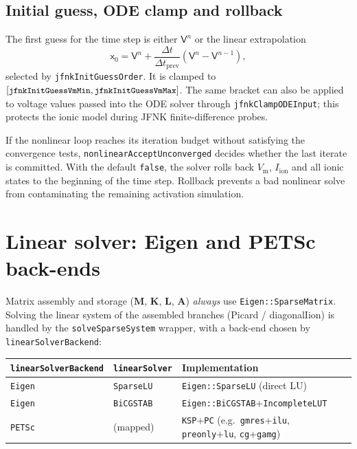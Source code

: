 \documentclass[11pt,a4paper]{article}
\newcommand{\code}[1]{\texttt{\small #1}}
\newcommand{\Vm}{V_{\text{m}}}
\newcommand{\Iion}{I_{\mathrm{ion}}}
\newcommand{\Mmass}{\mathbf{M}}
\newcommand{\Kstif}{\mathbf{K}}
\newcommand{\Lop}{\mathbf{L}}
\newcommand{\Aimp}{\mathbf{A}}
\begin{document}
\subsection{Initial guess, ODE clamp and rollback}

The first guess for the time step is either $\mathsf{V}^{n}$ or the
linear extrapolation
\begin{equation}
  \mathsf{x}_{0}
  =
  \mathsf{V}^{n}
  + \frac{\Delta t}{\Delta t_{\mathrm{prev}}}
    \left(\mathsf{V}^{n}-\mathsf{V}^{n-1}\right),
  \label{eq:extrap}
\end{equation}
selected by \code{jfnkInitGuessOrder}. It is clamped to
$[\code{jfnkInitGuessVmMin},\code{jfnkInitGuessVmMax}]$. The same
bracket can also be applied to voltage values passed into the ODE solver
through \code{jfnkClampODEInput}; this protects the ionic model during
JFNK finite-difference probes.

If the nonlinear loop reaches its iteration budget without satisfying
the convergence tests, \code{nonlinearAcceptUnconverged} decides whether
the last iterate is committed. With the default \code{false}, the solver
rolls back $\Vm$, $\Iion$ and all ionic states to the beginning of the
time step. Rollback prevents a bad nonlinear solve from contaminating
the remaining activation simulation.

\section{Linear solver: Eigen and PETSc back-ends}
\label{sec:linalg}

Matrix assembly and storage ($\Mmass$, $\Kstif$, $\Lop$,
$\Aimp$) \emph{always} use \code{Eigen::SparseMatrix}. Solving the linear
system of the assembled branches (Picard / diagonalIion) is handled by the
\code{solveSparseSystem} wrapper, with a back-end chosen by \code{linearSolverBackend}:

\begin{center}
\begin{tabular}{@{}lll@{}}
\toprule
\code{linearSolverBackend} & \code{linearSolver} & Implementation \\
\midrule
\code{Eigen} & \code{SparseLU}  & \code{Eigen::SparseLU} (direct LU) \\
\code{Eigen} & \code{BiCGSTAB}  & \code{Eigen::BiCGSTAB}+\code{IncompleteLUT} \\
\code{PETSc} & (mapped)         & \code{KSP}+\code{PC} (e.g.\ \code{gmres}+\code{ilu},
   \code{preonly}+\code{lu}, \code{cg}+\code{gamg}) \\
\bottomrule
\end{tabular}
\end{center}
\end{document}
